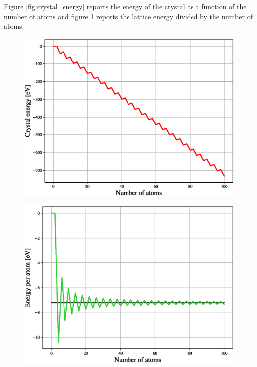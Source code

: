 \documentclass{article}
\begin{document}
Figure \ref{fig:crystal_energy} reports the energy of the crystal as a function of the number of atoms and figure \ref{fig:energy_per_atom} reports the lattice energy divided by the number of atoms.
\begin{figure}
\begin{minipage}{.5\textwidth}
    \centering
    \includegraphics[scale=0.4]{figures/lattice_energy.eps}
    \label{fig:crystal_energy}
\end{minipage}
\begin{minipage}{.5\textwidth}
    \centering
    \includegraphics[scale=0.4]{figures/energy_per_atom.eps}
    \label{fig:energy_per_atom}
\end{minipage}
\end{figure}
\end{document}
